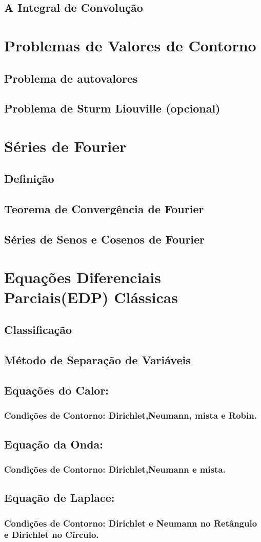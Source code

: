 \documentclass{article}
\begin{document}
\subsection{A Integral de Convolução}

\section{Problemas de Valores de Contorno}
\subsection{Problema de autovalores}
\subsection{Problema de Sturm Liouville (opcional)}

\section{Séries de Fourier}
\subsection{Definição}
\subsection{Teorema de Convergência de Fourier}
\subsection{Séries de Senos e Cosenos de Fourier}

\section{Equações Diferenciais Parciais(EDP) Clássicas}
\subsection{Classificação}
\subsection{Método de Separação de Variáveis}
\subsection{Equações do Calor:}
\subsubsection{Condições de Contorno: Dirichlet,Neumann, mista e Robin.}
\subsection{Equação da Onda:}
\subsubsection{Condições de Contorno: Dirichlet,Neumann e mista.}
\subsection{Equação de Laplace:}
\subsubsection{Condições de Contorno: Dirichlet e Neumann no Retângulo e Dirichlet no Círculo.}
\end{document}
